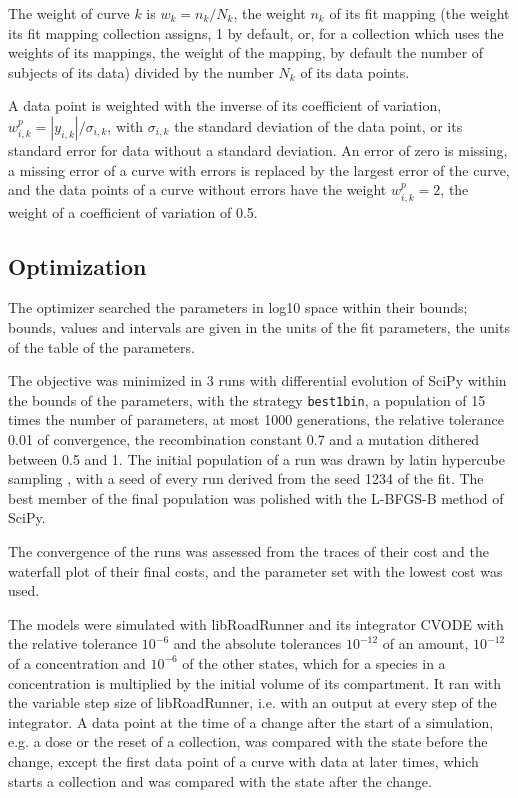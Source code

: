 \documentclass{article}
\begin{document}
The weight of curve $k$ is $w_k = n_k / N_k$, the weight $n_k$ of its fit mapping (the weight its fit mapping collection assigns, 1 by default, or, for a collection which uses the weights of its mappings, the weight of the mapping, by default the number of subjects of its data) divided by the number $N_k$ of its data points.

A data point is weighted with the inverse of its coefficient of variation, $w^{p}_{i,k} = |y_{i,k}| / \sigma_{i,k}$, with $\sigma_{i,k}$ the standard deviation of the data point, or its standard error for data without a standard deviation. An error of zero is missing, a missing error of a curve with errors is replaced by the largest error of the curve, and the data points of a curve without errors have the weight $w^{p}_{i,k} = 2$, the weight of a coefficient of variation of 0.5.

\subsection{Optimization}

The optimizer searched the parameters in log10 space within their bounds; bounds, values and intervals are given in the units of the fit parameters, the units of the table of the parameters.

The objective was minimized in 3 runs with differential evolution \cite{Storn1997} of SciPy \cite{Virtanen2020} within the bounds of the parameters, with the strategy \texttt{best1bin}, a population of 15 times the number of parameters, at most 1000 generations, the relative tolerance 0.01 of convergence, the recombination constant 0.7 and a mutation dithered between 0.5 and 1. The initial population of a run was drawn by latin hypercube sampling \cite{McKay1979}, with a seed of every run derived from the seed 1234 of the fit. The best member of the final population was polished with the L-BFGS-B method of SciPy.

The convergence of the runs was assessed from the traces of their cost and the waterfall plot of their final costs, and the parameter set with the lowest cost was used.

The models were simulated with libRoadRunner \cite{Welsh2023} and its integrator CVODE \cite{Hindmarsh2005} with the relative tolerance $10^{-6}$ and the absolute tolerances $10^{-12}$ of an amount, $10^{-12}$ of a concentration and $10^{-6}$ of the other states, which for a species in a concentration is multiplied by the initial volume of its compartment. It ran with the variable step size of libRoadRunner, i.e. with an output at every step of the integrator. A data point at the time of a change after the start of a simulation, e.g. a dose or the reset of a collection, was compared with the state before the change, except the first data point of a curve with data at later times, which starts a collection and was compared with the state after the change.
\end{document}
